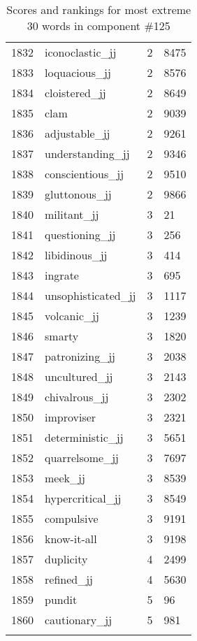 \begin{longtable}[!htbp]{| rlr@{.}l |}
    1832 & iconoclastic\_jj & 2 & 8475 \\
    1833 & loquacious\_jj & 2 & 8576 \\
    1834 & cloistered\_jj & 2 & 8649 \\
    1835 & clam & 2 & 9039 \\
    1836 & adjustable\_jj & 2 & 9261 \\
    1837 & understanding\_jj & 2 & 9346 \\
    1838 & conscientious\_jj & 2 & 9510 \\
    1839 & gluttonous\_jj & 2 & 9866 \\
    1840 & militant\_jj & 3 & 21 \\
    1841 & questioning\_jj & 3 & 256 \\
    1842 & libidinous\_jj & 3 & 414 \\
    1843 & ingrate & 3 & 695 \\
    1844 & unsophisticated\_jj & 3 & 1117 \\
    1845 & volcanic\_jj & 3 & 1239 \\
    1846 & smarty & 3 & 1820 \\
    1847 & patronizing\_jj & 3 & 2038 \\
    1848 & uncultured\_jj & 3 & 2143 \\
    1849 & chivalrous\_jj & 3 & 2302 \\
    1850 & improviser & 3 & 2321 \\
    1851 & deterministic\_jj & 3 & 5651 \\
    1852 & quarrelsome\_jj & 3 & 7697 \\
    1853 & meek\_jj & 3 & 8539 \\
    1854 & hypercritical\_jj & 3 & 8549 \\
    1855 & compulsive & 3 & 9191 \\
    1856 & know-it-all & 3 & 9198 \\
    1857 & duplicity & 4 & 2499 \\
    1858 & refined\_jj & 4 & 5630 \\
    1859 & pundit & 5 & 96 \\
    1860 & cautionary\_jj & 5 & 981 \\
    \hline
    \caption{Scores and rankings for most extreme 30 words in component \#125} \\
\end{longtable}
